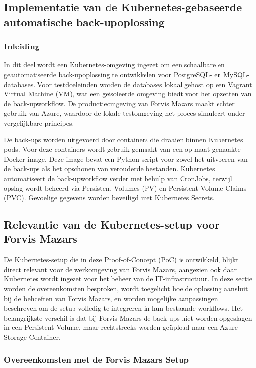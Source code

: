 \subsection{Implementatie van de Kubernetes-gebaseerde automatische back-upoplossing}

\subsubsection{Inleiding}
In dit deel wordt een Kubernetes-omgeving ingezet om een schaalbare en geautomatiseerde back-upoplossing te ontwikkelen voor PostgreSQL- en MySQL-databases. Voor testdoeleinden worden de databases lokaal gehost op een Vagrant Virtual Machine (VM), wat een geïsoleerde omgeving biedt voor het opzetten van de back-upworkflow. De productieomgeving van Forvis Mazars maakt echter gebruik van Azure, waardoor de lokale testomgeving het proces simuleert onder vergelijkbare principes.

De back-ups worden uitgevoerd door containers die draaien binnen Kubernetes pods. Voor deze containers wordt gebruik gemaakt van een op maat gemaakte Docker-image. Deze image bevat een Python-script voor zowel het uitvoeren van de back-ups als het opschonen van verouderde bestanden. Kubernetes automatiseert de back-upworkflow verder met behulp van CronJobs, terwijl opslag wordt beheerd via Persistent Volumes (PV) en Persistent Volume Claims (PVC). Gevoelige gegevens worden beveiligd met Kubernetes Secrets.

\subsection{Relevantie van de Kubernetes-setup voor Forvis Mazars}

De Kubernetes-setup die in deze Proof-of-Concept (PoC) is ontwikkeld, blijkt direct relevant voor de werkomgeving van Forvis Mazars, aangezien ook daar Kubernetes wordt ingezet voor het beheer van de IT-infrastructuur. In deze sectie worden de overeenkomsten besproken, wordt toegelicht hoe de oplossing aansluit bij de behoeften van Forvis Mazars, en worden mogelijke aanpassingen beschreven om de setup volledig te integreren in hun bestaande workflows. Het belangrijkste verschil is dat bij Forvis Mazars de back-ups niet worden opgeslagen in een Persistent Volume, maar rechtstreeks worden geüpload naar een Azure Storage Container.

\subsubsection*{Overeenkomsten met de Forvis Mazars Setup}

